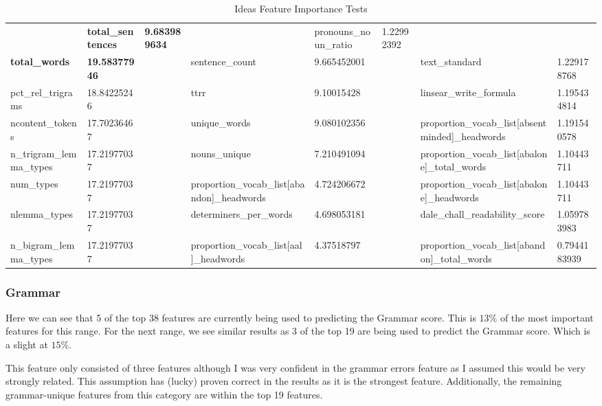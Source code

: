 \begin{table}[h]
{\begin{tabular}{@{}llllllll@{}}
  &
  \cellcolor[HTML]{EFEFEF}\textbf{total\_sentences} &
  \cellcolor[HTML]{EFEFEF}\textbf{9.683989634} &
  &
  pronouns\_noun\_ratio &
  1.22992392 \\
\cellcolor[HTML]{EFEFEF}\textbf{total\_words} &
  \cellcolor[HTML]{EFEFEF}\textbf{19.58377946} &
  &
  sentence\_count &
  9.665452001 &
  &
  text\_standard &
  1.229178768 \\
pct\_rel\_trigrams &
  18.84225246 &
  &
  ttrr &
  9.10015428 &
  &
  linsear\_write\_formula &
  1.195434814 \\
ncontent\_tokens &
  17.70236467 &
  &
  unique\_words &
  9.080102356 &
  &
  proportion\_vocab\_list{[}absentminded{]}\_headwords &
  1.191540578 \\
n\_trigram\_lemma\_types &
  17.21977037 &
  &
  nouns\_unique &
  7.210491094 &
  &
  proportion\_vocab\_list{[}abalone{]}\_total\_words &
  1.10443711 \\
num\_types &
  17.21977037 &
  &
  proportion\_vocab\_list{[}abandon{]}\_headwords &
  4.724206672 &
  &
  proportion\_vocab\_list{[}abalone{]}\_headwords &
  1.10443711 \\
nlemma\_types &
  17.21977037 &
  &
  determiners\_per\_words &
  4.698053181 &
  &
  dale\_chall\_readability\_score &
  1.059783983 \\
n\_bigram\_lemma\_types &
  17.21977037 &
  &
  proportion\_vocab\_list{[}aal{]}\_headwords &
  4.37518797 &
  &
  proportion\_vocab\_list{[}abandon{]}\_total\_words &
  0.7944183939 \\ \bottomrule
\end{tabular}%
}
\caption{Ideas Feature Importance Tests}
\label{tab:e2}
\end{table}

\subsubsection{Grammar}

Here we can see that 5 of the top 38 features are currently being used to predicting the Grammar score. This is $13\%$ of the most important features for this range. For the next range, we see similar results as 3 of the top 19 are being used to predict the Grammar score. Which is a slight at $15\%$.

This feature only consisted of three features although I was very confident in the grammar errors feature as I assumed this would be very strongly related. This assumption has (lucky) proven correct in the results as it is the strongest feature. Additionally, the remaining grammar-unique features from this category are within the top 19 features. 

